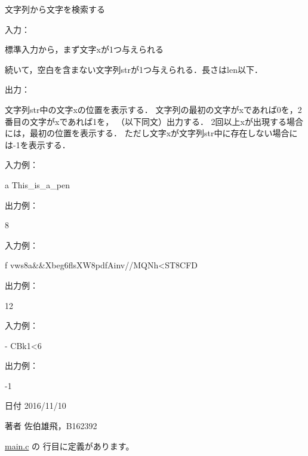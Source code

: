 文字列から文字を検索する 

入力：
\begin{DoxyItemize}
\item 標準入力から，まず文字xが1つ与えられる
\item 続いて，空白を含まない文字列strが1つ与えられる．長さはlen以下．
\end{DoxyItemize}

出力：
\begin{DoxyItemize}
\item 文字列str中の文字xの位置を表示する． 文字列の最初の文字がxであれば0を，2番目の文字がxであれば1を， （以下同文）出力する． 2回以上xが出現する場合には，最初の位置を表示する． ただし文字xが文字列str中に存在しない場合には-\/1を表示する．
\end{DoxyItemize}

入力例： \begin{DoxyVerb}a This_is_a_pen
\end{DoxyVerb}
 出力例： \begin{DoxyVerb}8
\end{DoxyVerb}
 入力例： \begin{DoxyVerb}f vws8a&&Xbeg6flsXW8pdfAinv//MQNh<ST8CFD
\end{DoxyVerb}
 出力例： \begin{DoxyVerb}12
\end{DoxyVerb}
 入力例： \begin{DoxyVerb}- CBk1<6
\end{DoxyVerb}
 出力例： \begin{DoxyVerb}-1
\end{DoxyVerb}
 \begin{DoxyDate}{日付}
2016/11/10 
\end{DoxyDate}
\begin{DoxyAuthor}{著者}
佐伯雄飛，\-B162392 
\end{DoxyAuthor}


 \hyperlink{main_8c_source}{main.\-c} の  行目に定義があります。


